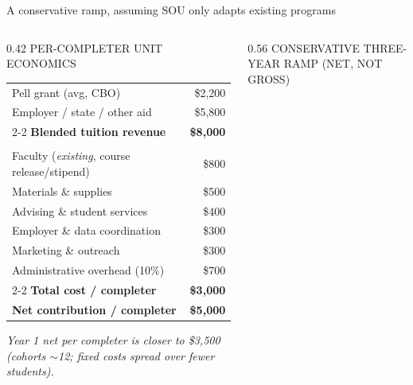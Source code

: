 \documentclass[aspectratio=169,11pt]{beamer}
\newcommand{\eyebrow}[1]{%
  {\sffamily\fontsize{7.5pt}{9pt}\selectfont
   \color{textMuted}%
   \MakeUppercase{#1}%
  }%
}
\begin{document}
\begin{frame}{A conservative ramp, assuming SOU only adapts existing programs}
  \begin{columns}[T,onlytextwidth]
    \begin{column}{0.42\textwidth}
      \rmfamily\fontsize{9.4pt}{12pt}\selectfont
      \color{textPrimary}
      \eyebrow{per-completer unit economics}
      \vspace{4pt}\par
      \begin{tabular}{@{}lr@{}}
        Pell grant (avg, CBO)              & \$2{,}200\\
        Employer / state / other aid       & \$5{,}800\\
        \cmidrule{2-2}
        \textbf{Blended tuition revenue}   & \textbf{\$8{,}000}\\
        \addlinespace[2pt]
        \multicolumn{2}{@{}l@{}}{\textit{\color{textMuted}cost side, mature program (30+ cohort)}}\\
        Faculty (\emph{existing}, course release/stipend)
                                           & \$800\\
        Materials \& supplies              & \$500\\
        Advising \& student services       & \$400\\
        Employer \& data coordination      & \$300\\
        Marketing \& outreach              & \$300\\
        Administrative overhead (10\%)     & \$700\\
        \cmidrule{2-2}
        \textbf{Total cost / completer}    & \textbf{\$3{,}000}\\
        \addlinespace[2pt]
        \textbf{Net contribution / completer}
                                           & \textbf{\$5{,}000}\\
      \end{tabular}
      \par\vspace{4pt}
      {\color{textSecondary}\itshape\fontsize{9pt}{11.5pt}\selectfont
       Year 1 net per completer is closer to \$3{,}500
       (cohorts $\sim$12; fixed costs spread over fewer students).}
    \end{column}
    \begin{column}{0.56\textwidth}
      \centering
      \rmfamily\fontsize{9.4pt}{12pt}\selectfont
      \color{textPrimary}
      \eyebrow{conservative three-year ramp (NET, not gross)}

\end{column}
\end{columns}
\end{frame}
\end{document}
